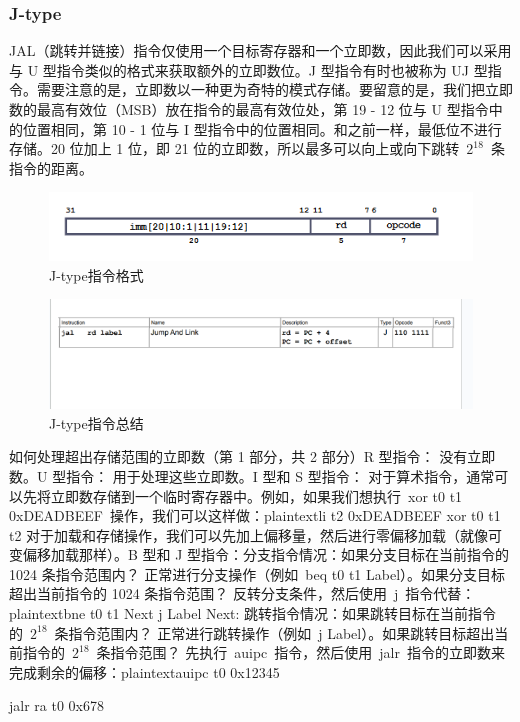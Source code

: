 \documentclass{ctexart}
\begin{document}
\subsubsection{J-type}
JAL（跳转并链接）指令仅使用一个目标寄存器和一个立即数，因此我们可以采用与 U 型指令类似的格式来获取额外的立即数位。J 型指令有时也被称为 UJ 型指令。需要注意的是，立即数以一种更为奇特的模式存储。要留意的是，我们把立即数的最高有效位（MSB）放在指令的最高有效位处，第 19 - 12 位与 U 型指令中的位置相同，第 10 - 1 位与 I 型指令中的位置相同。和之前一样，最低位不进行存储。20 位加上 1 位，即 21 位的立即数，所以最多可以向上或向下跳转 \(2^{18}\) 条指令的距离。
\begin{figure}
    \centering
    \includegraphics[width=0.5\linewidth]{J-type指令格式.png}
    \caption{J-type指令格式}
    \label{fig:enter-label}
\end{figure}
\begin{figure}
        \centering
        \includegraphics[width=0.5\linewidth]{J-type指令总结.png}
        \caption{J-type指令总结}
        \label{fig:enter-label}
    \end{figure}
    如何处理超出存储范围的立即数（第 1 部分，共 2 部分）R 型指令：
没有立即数。U 型指令：
用于处理这些立即数。I 型和 S 型指令：
对于算术指令，通常可以先将立即数存储到一个临时寄存器中。例如，如果我们想执行 xor t0 t1 0xDEADBEEF 操作，我们可以这样做：plaintextli t2 0xDEADBEEF
xor t0 t1 t2
对于加载和存储操作，我们可以先加上偏移量，然后进行零偏移加载（就像可变偏移加载那样）。B 型和 J 型指令：分支指令情况：如果分支目标在当前指令的 1024 条指令范围内？
正常进行分支操作（例如 beq t0 t1 Label）。如果分支目标超出当前指令的 1024 条指令范围？
反转分支条件，然后使用 j 指令代替：plaintextbne t0 t1 Next
j Label
Next:
跳转指令情况：如果跳转目标在当前指令的 \(2^{18}\) 条指令范围内？
正常进行跳转操作（例如 j Label）。如果跳转目标超出当前指令的 \(2^{18}\) 条指令范围？
先执行 auipc 指令，然后使用 jalr 指令的立即数来完成剩余的偏移：plaintextauipc t0 0x12345\par
jalr ra t0 0x678\par
\end{document}
